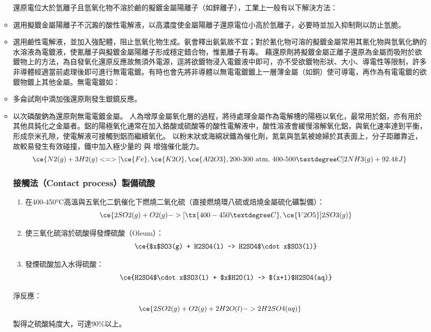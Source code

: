 \documentclass[a4paper,12pt]{report}
\begin{document}
\begin{itemize}
\begin{itemize}
還原電位大於氫離子且氫氧化物不溶於鹼的擬鍍金屬陽離子（如鋅離子），工業上一般有以下解決方法：
\bit
\item 選用擬鍍金屬陽離子不沉澱的酸性電解液，以高濃度使金屬陽離子還原電位小高於氫離子，必要時並加入抑制劑以防止氫脆。
\item 選用鹼性電解液，並加入強配體，阻止氫氧化物生成。氨會釋出氨氣故不宜；對於氰化物可溶的擬鍍金屬常用其氰化物與氫氧化鈉的水溶液為電鍍液，使氰離子與擬鍍金屬陽離子形成穩定錯合物，惟氰離子有毒。
\eit
{}
藉還原劑將擬鍍金屬正離子還原為金屬而吸附於欲鍍物上的方法，為自發氧化還原反應故無須外電源，逕將欲鍍物浸入電鍍液中即可，亦不受欲鍍物形狀、大小、導電性等限制，許多非導體經適當前處理後即可進行無電電鍍。有時也會先將非導體以無電電鍍鍍上一層薄金屬（如銅）使可導電，再作為有電電鍍的欲鍍物鍍上其他金屬。無電電鍍如：
\bit
\item 多侖試劑中滴加強還原劑發生銀鏡反應。
\item 以次磷酸鈉為還原劑無電電鍍金屬。
\eit
{}
人為增厚金屬氧化層的過程，將待處理金屬作為電解槽的陽極以氧化，最常用於鋁，亦有用於其他具鈍化之金屬者。鋁的陽極氧化通常在加入鉻酸或硫酸等的酸性電解液中，酸性溶液會緩慢溶解氧化鋁，與氧化速率達到平衡，形成奈米孔隙，使電解液可接觸到鋁而繼續氧化。
以粉末狀或海綿狀鐵為催化劑，氮氣與氫氣被媳婦於其表面上，分子距離靠近，故較易發生有效碰撞，鐵中加入極少量的 與 增強催化能力。
\[\ce{N2(g) + 3H2(g) <=>[\ce{Fe}, \ce{K2O}, \ce{Al2O3}, \text{200-300 atm, 400-500°C}] 2NH3(g) + 92.4kJ}\]
\subsubsection{接觸法（Contact process）製備硫酸}
\begin{enumerate}
\item 在400-450°C高溫與五氧化二釩催化下燃燒二氧化硫（直接燃燒環八硫或焙燒金屬硫化礦製備）：
\[\ce{2SO2(g) + O2(g) ->[\tx{400-450°C}, \ce{V2O5}] 2SO3(g)}\]
\item 使三氧化硫溶於硫酸得發煙硫酸（Oleum）：
\[\ce{$x$SO3(g) + H2SO4(l) -> H2SO4$\cdot x$SO3(l)}\]
\item 發煙硫酸加入水得硫酸：
\[\ce{H2SO4$\cdot x$SO3(l) + $x$H2O(l) -> $(x+1)$H2SO4(aq)}\]
\end{enumerate}
淨反應：
\[\ce{2SO2(g) + O2(g) + 2H2O(l) -> 2H2SO4(aq)}\]
製得之硫酸純度大，可達90\%以上。

\end{itemize}
\end{itemize}
\end{document}
